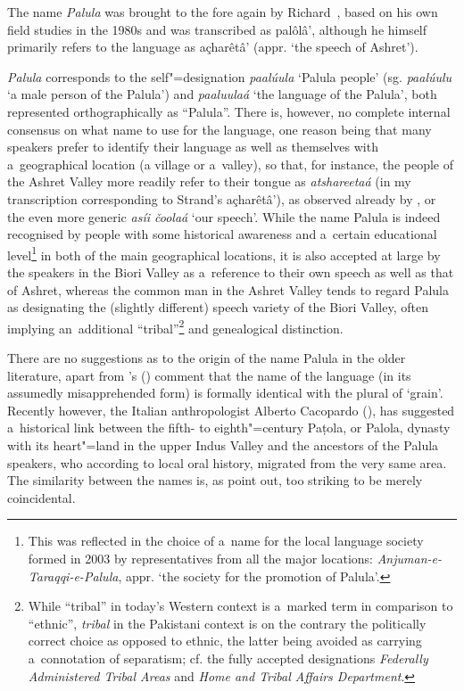 The name \textit{Palula} was brought to the fore again by Richard~\citet{strand1997/2008}, based on
his own field studies in the 1980s and was transcribed as palôlâ', although he himself primarily
refers to the language as açharêtâ' (appr. `the speech of Ashret').


\textit{Palula} corresponds to the self"=designation \textit{paalúula} `Palula people'
(sg. \textit{paalúulu} `a male person of the Palula') and \textit{paaluulaá} `the language
of the Palula', both represented orthographically as ``Palula''. There is, however, no complete
internal consensus on what name to use for the language, one reason being that many speakers prefer
to identify their language as well as themselves with a~geographical location (a village or
a~valley), so that, for instance, the people of the Ashret Valley more readily refer to their tongue
as \textit{atshareetaá} (in my transcription corresponding to Strand's
açharêtâ'), as observed already by \citet{morgenstierne1941}, or the even more
generic \textit{asíi čoolaá} `our speech'. While the name Palula is indeed recognised by
people with some historical awareness and a~certain educational level\footnote{This was reflected in
  the choice of a~name for the local language society formed in 2003 by representatives from all the
  major locations: \textit{Anjuman-e-Taraqqi-e-Palula}, appr. `the society for the promotion of
  Palula'.} in both of the main geographical locations, it is also accepted at large by the speakers
in the Biori Valley as a~reference to their own speech as well as that of Ashret, whereas the common
man in the Ashret Valley tends to regard Palula as designating the (slightly different) speech
variety of the Biori Valley, often implying an~additional ``tribal''\footnote{While ``tribal'' in
  today's Western context is a~marked term in comparison to ``ethnic'', \textit{tribal} in the
  Pakistani context is on the contrary the politically correct choice as opposed to ethnic, the
  latter being avoided as carrying a~connotation of separatism; cf. the fully accepted designations
  \textit{Federally Administered Tribal Areas} and \textit{Home and Tribal Affairs Department}.} and
genealogical distinction.


There are no suggestions as to the origin of the name Palula in the older literature, apart from \citeauthor{morgenstierne1941}'s (\citeyear[53]{morgenstierne1941}) comment that the name of the language (in its assumedly misapprehended form) is formally identical with the plural of `grain'. Recently however, the Italian anthropologist Alberto Cacopardo (\citeyear[91]{cacopardo2001}), has suggested a~historical link between the fifth- to eighth"=century Paṭola, or Palola, dynasty with its heart"=land in the upper Indus Valley and the ancestors of the Palula speakers, who according to local oral history, migrated from the very same area. The similarity between the names is, as \citet[3]{schmidtkohistani2008} point out, too striking to be merely coincidental.


